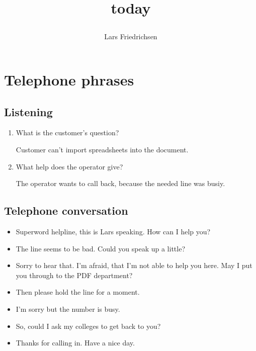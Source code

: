 \documentclass[a4paper,11pt]{scrartcl}%
\title{today\author{Lars Friedrichsen}}
\begin{document}
\section{Telephone phrases}

	\subsection{Listening}

	\begin{enumerate}
		\item What is the customer's question?\par
			Customer can't import spreadsheets into the document.
		
		\item What help does the operator give?\par
			The operator wants to call back, because the needed line was busiy.
	\end{enumerate}

	\subsection{Telephone conversation}

		\begin{itemize}
			\item Superword helpline, this is Lars speaking. How can I help you?
			\item The line seems to be bad. Could you speak up a little?
			\item Sorry to hear that. I'm afraid, that I'm not able to help you here.
				May I put you through to the PDF department?
			\item Then please hold the line for a moment.
			\item I'm sorry but the number is busy.
			\item So, could I ask my colleges to get back to you?
			\item Thanks for calling in. Have a nice day.
		\end{itemize}
\end{document}
